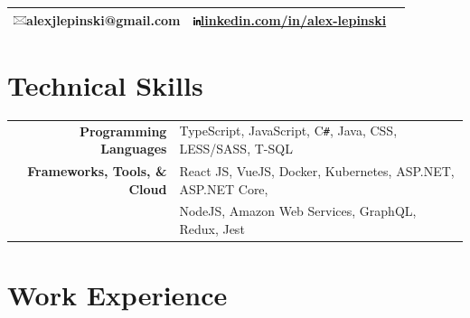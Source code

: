 \documentclass[10pt]{article}
\newcommand{\emailicon}{\includegraphics[height=2.4mm,keepaspectratio]{emailicon.jpg}}
\newcommand{\linkedinicon}{\includegraphics[height=2.2mm,keepaspectratio]{linkedinicon.png}}
\begin{document}
\pagestyle{empty} %

\par{\par}

\begin{center}{\def\arraystretch{1.5}
\begin{tabular}{ccc}
    \hline\hline
    \emailicon  \space alexjlepinski@gmail.com &
    \linkedinicon \space \url{linkedin.com/in/alex-lepinski}\\
	\hline\hline
\end{tabular}
}\end{center}


\vspace*{-\baselineskip}
\vspace{7mm}

\section{Technical Skills}

\begin{tabular}{rp{13.1cm}}
\textbf{\space Programming Languages}
	& TypeScript, JavaScript,  \textsc{C\texttt{\#}}, 
    Java, CSS, LESS/SASS, T-SQL\\
\textbf{\space Frameworks, Tools, \& Cloud}
	& React JS, VueJS, Docker, Kubernetes, ASP.NET, ASP.NET Core, \\
	& NodeJS,  Amazon Web Services, GraphQL, Redux, Jest \\ 
\end{tabular}
\vspace*{-\baselineskip}
\vspace{3mm}

\vspace*{-\baselineskip}
\vspace{3mm}

\section{Work Experience}
\end{document}
